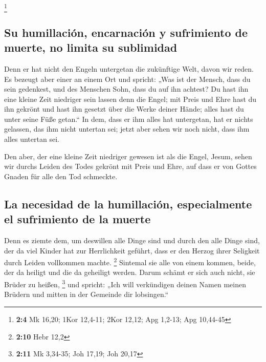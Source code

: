 \footnote{\textbf{2:4} Mk 16,20; 1Kor 12,4-11; 2Kor 12,12; Apg 1,2-13;
  Apg 10,44-45}

\hypertarget{su-humillaciuxf3n-encarnaciuxf3n-y-sufrimiento-de-muerte-no-limita-su-sublimidad}{%
\subsection{Su humillación, encarnación y sufrimiento de muerte, no
limita su
sublimidad}\label{su-humillaciuxf3n-encarnaciuxf3n-y-sufrimiento-de-muerte-no-limita-su-sublimidad}}

 Denn er hat nicht den Engeln untergetan die zukünftige
Welt, davon wir reden.  Es bezeugt aber einer an einem Ort
und spricht: „Was ist der Mensch, dass du sein gedenkest, und des
Menschen Sohn, dass du auf ihn achtest?  Du hast ihn eine
kleine Zeit niedriger sein lassen denn die Engel; mit Preis und Ehre
hast du ihn gekrönt und hast ihn gesetzt über die Werke deiner Hände;
 alles hast du unter seine Füße getan.`` In dem, dass er
ihm alles hat untergetan, hat er nichts gelassen, das ihm nicht untertan
sei; jetzt aber sehen wir noch nicht, dass ihm alles untertan sei.

 Den aber, der eine kleine Zeit niedriger gewesen ist als
die Engel, Jesum, sehen wir durchs Leiden des Todes gekrönt mit Preis
und Ehre, auf dass er von Gottes Gnaden für alle den Tod schmeckte.

\hypertarget{la-necesidad-de-la-humillaciuxf3n-especialmente-el-sufrimiento-de-la-muerte}{%
\subsection{La necesidad de la humillación, especialmente el sufrimiento
de la
muerte}\label{la-necesidad-de-la-humillaciuxf3n-especialmente-el-sufrimiento-de-la-muerte}}

 Denn es ziemte dem, um deswillen alle Dinge sind und
durch den alle Dinge sind, der da viel Kinder hat zur Herrlichkeit
geführt, dass er den Herzog ihrer Seligkeit durch Leiden vollkommen
machte. \footnote{\textbf{2:10} Hebr 12,2}  Sintemal sie
alle von einem kommen, beide, der da heiligt und die da geheiligt
werden. Darum schämt er sich auch nicht, sie Brüder zu heißen,
\footnote{\textbf{2:11} Mk 3,34-35; Joh 17,19; Joh 20,17}
 und spricht: „Ich will verkündigen deinen Namen meinen
Brüdern und mitten in der Gemeinde dir lobsingen.``

